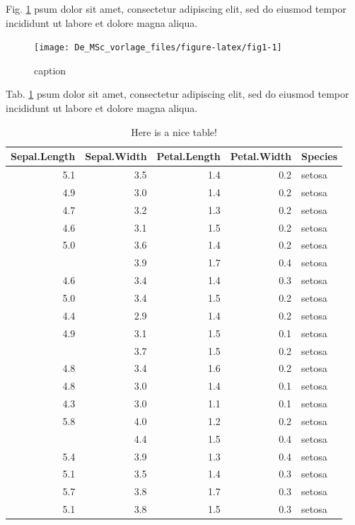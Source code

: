 \documentclass[]{book}
\theoremstyle{definition}
\theoremstyle{definition}
\theoremstyle{definition}
\theoremstyle{remark}
\begin{document}
Fig. \ref{fig:fig1} psum dolor sit amet, consectetur adipiscing elit,
sed do eiusmod tempor incididunt ut labore et dolore magna aliqua.

\begin{figure}

{\centering \texttt{[image: De\_MSc\_vorlage\_files/figure-latex/fig1-1]} 

}

\caption{caption}\label{fig:fig1}
\end{figure}

Tab. \ref{tab:tab1} psum dolor sit amet, consectetur adipiscing elit,
sed do eiusmod tempor incididunt ut labore et dolore magna aliqua.

\begin{table}

\caption{\label{tab:tab1}Here is a nice table!}
\centering
\begin{tabular}[t]{rrrrl}
\toprule
Sepal.Length & Sepal.Width & Petal.Length & Petal.Width & Species\\
\midrule
5.1 & 3.5 & 1.4 & 0.2 & setosa\\
4.9 & 3.0 & 1.4 & 0.2 & setosa\\
4.7 & 3.2 & 1.3 & 0.2 & setosa\\
4.6 & 3.1 & 1.5 & 0.2 & setosa\\
5.0 & 3.6 & 1.4 & 0.2 & setosa\\
\addlinespace
5.4 & 3.9 & 1.7 & 0.4 & setosa\\
4.6 & 3.4 & 1.4 & 0.3 & setosa\\
5.0 & 3.4 & 1.5 & 0.2 & setosa\\
4.4 & 2.9 & 1.4 & 0.2 & setosa\\
4.9 & 3.1 & 1.5 & 0.1 & setosa\\
\addlinespace
5.4 & 3.7 & 1.5 & 0.2 & setosa\\
4.8 & 3.4 & 1.6 & 0.2 & setosa\\
4.8 & 3.0 & 1.4 & 0.1 & setosa\\
4.3 & 3.0 & 1.1 & 0.1 & setosa\\
5.8 & 4.0 & 1.2 & 0.2 & setosa\\
\addlinespace
5.7 & 4.4 & 1.5 & 0.4 & setosa\\
5.4 & 3.9 & 1.3 & 0.4 & setosa\\
5.1 & 3.5 & 1.4 & 0.3 & setosa\\
5.7 & 3.8 & 1.7 & 0.3 & setosa\\
5.1 & 3.8 & 1.5 & 0.3 & setosa\\
\bottomrule
\end{tabular}
\end{table}
\end{document}

